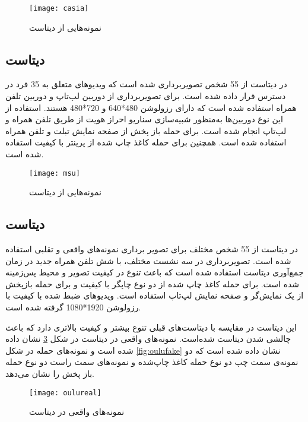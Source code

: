  \begin{figure}[h]
	\centerline{\texttt{[image: casia]}}
	\caption{نمونه‌هایی از دیتاست  \cite{zhang2012face} }
	\label{fig:casia}
\end{figure}

\subsection{دیتاست }
در دیتاست 
\cite{wen2015face}
 از 55 شخص تصویربرداری شده است که ویدیوهای متعلق به 35 فرد در دسترس قرار داده شده است. برای تصویربرداری از دوربین لپ‌تاپ و دوربین تلفن همراه استفاده شده است که دارای رزولوشن 480*640 و 720*480 هستند. استفاده از این نوع دوربین‌ها به‌منظور شبیه‌سازی سناریو احراز هویت از طریق تلفن همراه و لپ‌تاپ انجام شده است. برای حمله باز پخش از صفحه نمایش تبلت و تلفن همراه استفاده شده است. همچنین برای حمله کاغذ چاپ شده از پرینتر با کیفیت استفاده شده است.

 \begin{figure}[h]
	\centerline{\texttt{[image: msu]}}
	\caption{نمونه‌هایی از دیتاست  \cite{wen2015face} }
	\label{fig:msu}
\end{figure}

\subsection{دیتاست }
در دیتاست 
\cite{boulkenafet2017oulu}
از 55 شخص مختلف برای تصویر برداری نمونه‌های واقعی و تقلبی استفاده شده است. تصویربرداری در سه نشست مختلف، با شش تلفن همراه جدید در زمان جمع‌آوری دیتاست استفاده شده است که باعث تنوع در کیفیت تصویر و محیط پس‌زمینه شده است. برای حمله کاغذ چاپ شده از دو نوع چاپگر با کیفیت و برای حمله بازپخش از یک نمایش‌گر و صفحه نمایش لپ‌تاپ استفاده است. ویدیوهای ضبط شده با کیفیت  با رزولوشن 1920*1080 گرفته شده است.

این دیتاست در مقایسه با دیتاست‌های قبلی تنوع بیشتر و کیفیت بالاتری دارد که باعث چالشی شدن دیتاست شده‌است. نمونه‌های واقعی در دیتاست  در شکل 
\ref{fig:oulureal}
 نشان داده شده است و نمونه‌های حمله در شکل 
 \ref{fig:oulufake}
 نشان داده شده است که دو نمونه‌ی سمت چپ دو نوع حمله کاغذ چاپ‌شده و نمونه‌های سمت راست دو نوع حمله باز پخش را نشان می‌دهد. 
 
  \begin{figure}[h]
 	\centerline{\texttt{[image: oulureal]}}
 	\caption{نمونه‌های واقعی در دیتاست  \cite{boulkenafet2017oulu} }
 	\label{fig:oulureal}
 \end{figure}
 
